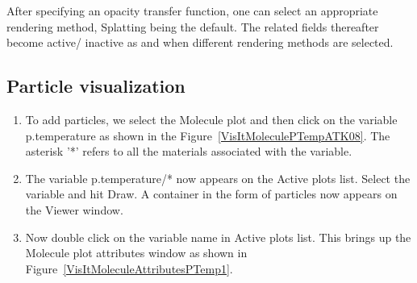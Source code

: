 After specifying an opacity transfer function, one can select an
appropriate rendering method, Splatting being the default. The related
fields thereafter become active/ inactive as and when different
rendering methods are selected.

\subsection{Particle visualization}

\begin{enumerate}

\item To add particles, we select the Molecule plot and then click on
  the variable p.temperature as shown in the
  Figure~\ref{VisItMoleculePTempATK08}. The asterisk '*' refers to all
  the materials associated with the variable.


\item The variable p.temperature/* now appears on the Active plots
  list. Select the variable and hit Draw. A container in the form of
  particles now appears on the Viewer window.

\item Now double click on the variable name in Active plots list. This
  brings up the Molecule plot attributes window as shown in
  Figure~\ref{VisItMoleculeAttributesPTemp1}.

\end{enumerate}


\begin{figure}[h]
  \centering
  \vspace{-10pt}
  \hspace{10pt}
 \hspace{10pt}
 \vspace{-10pt}
  \caption{}
  \label{}
\end{figure}


